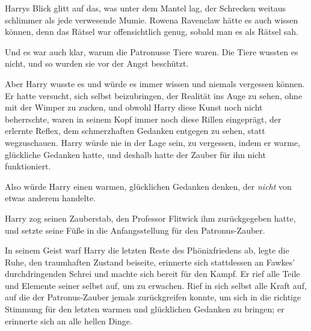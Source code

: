 Harrys Blick glitt auf das, was unter dem Mantel lag, der Schrecken weitaus schlimmer als jede verwesende Mumie. Rowena Ravenclaw hätte es auch wissen können, denn das Rätsel war offensichtlich genug, sobald man es als Rätsel sah.

Und es war auch klar, warum die Patronusse Tiere waren. Die Tiere wussten es nicht, und so wurden sie vor der Angst beschützt.

Aber Harry wusste es und würde es immer wissen und niemals vergessen können. Er hatte versucht, sich selbst beizubringen, der Realität ins Auge zu sehen, ohne mit der Wimper zu zucken, und obwohl Harry diese Kunst noch nicht beherrschte, waren in seinem Kopf immer noch diese Rillen eingeprägt, der erlernte Reflex, dem schmerzhaften Gedanken entgegen zu sehen, statt wegzuschauen. Harry würde nie in der Lage sein, zu vergessen, indem er warme, glückliche Gedanken hatte, und deshalb hatte der Zauber für ihn nicht funktioniert.

Also würde Harry einen warmen, glücklichen Gedanken denken, der \emph{nicht} von etwas anderem handelte.

Harry zog seinen Zauberstab, den Professor Flitwick ihm zurückgegeben hatte, und setzte seine Füße in die Anfangsstellung für den Patronus-Zauber.

In seinem Geist warf Harry die letzten Reste des Phönixfriedens ab, legte die Ruhe, den traumhaften Zustand beiseite, erinnerte sich stattdessen an Fawkes’ durchdringenden Schrei und machte sich bereit für den Kampf. Er rief alle Teile und Elemente seiner selbst auf, um zu erwachen. Rief in sich selbst alle Kraft auf, auf die der Patronus-Zauber jemals zurückgreifen konnte, um sich in die richtige Stimmung für den letzten warmen und glücklichen Gedanken zu bringen; er erinnerte sich an alle hellen Dinge.

